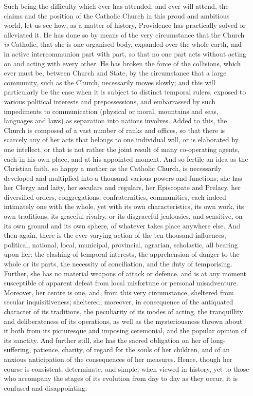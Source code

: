 Such being the difficulty which ever has attended, and ever will
attend, the claims and the position of the Catholic Church in this
proud and ambitious world, let us see how, as a matter of history,
Providence has practically solved or alleviated it. He has done so by
means of the very circumstance that the Church \emph{is} Catholic,
that she is one organised body, expanded over the whole earth, and in
active intercommunion part with part, so that no one part acts without
acting on and acting with every other. He has broken the force of the
collisions, which ever must be, between Church and State, by the
circumstance that a large community, such as the Church, necessarily
moves slowly; and this will particularly be the case when it is
subject to distinct temporal rulers, exposed to various political
interests and prepossessions, and embarrassed by such impediments to
communication (physical or moral, mountains and seas, languages and
laws) as separation into nations involves. Added to this, the Church
is composed of a vast number of ranks and offices, so that there is
scarcely any of her acts that belongs to one individual will, or is
elaborated by one intellect, or that is not rather the joint result of
many co-operating agents, each in his own place, and at his appointed
moment. And so fertile an idea as the Christian faith, so happy a
mother as the Catholic Church, is necessarily developed and multiplied
into a thousand various powers and functions; she has her Clergy and
laity, her seculars and regulars, her Episcopate and Prelacy, her
diversified orders, congregations, confraternities, communities, each
indeed intimately one with the whole, yet with its own
characteristics, its own work, its own traditions, its graceful
rivalry, or its disgraceful jealousies, and sensitive, on its own
ground and its own sphere, of whatever takes place anywhere else. And
then again, there is the ever-varying action of the ten thousand
influences, political, national, local, municipal, provincial,
agrarian, scholastic, all bearing upon her; the clashing of temporal
interests, the apprehension of danger to the whole or its parts, the
necessity of conciliation, and the duty of temporising. Further, she
has no material weapons of attack or defence, and is at any moment
susceptible of apparent defeat from local misfortune or personal
misadventure. Moreover, her centre is one, and, from this very
circumstance, sheltered from secular inquisitiveness; sheltered,
moreover, in consequence of the antiquated character of its
traditions, the peculiarity of its modes of acting, the tranquillity
and deliberateness of its operations, as well as the mysteriousness
thrown about it both from its picturesque and imposing ceremonial, and
the popular opinion of its sanctity. And further still, she has the
sacred obligation on her of long-suffering, patience, charity, of
regard for the souls of her children, and of an anxious anticipation
of the consequences of her measures. Hence, though her course is
consistent, determinate, and simple, when viewed in history, yet to
those who accompany the stages of its evolution from day to day as
they occur, it is confused and disappointing.


